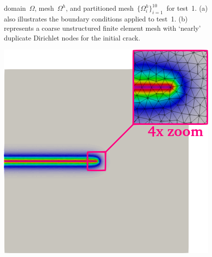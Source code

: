 \documentclass{report}
\begin{document}
\begin{figure}[tb]
\begin{minipage}[t]{.3\textwidth}
	\end{minipage}
	\caption{domain~$\Omega$, mesh~$\Omega^h$, and partitioned mesh~$\{\Omega^h_i\}_{i=1}^{10}$~for test~1. (a) also illustrates the boundary conditions applied to test~1. (b) represents a coarse unstructured finite element mesh with `nearly' duplicate Dirichlet nodes for the initial crack.\label{fig:figcrack-fe-geo-crop}}
\end{figure}	

\begin{figure}[tb]
	\centering
	\begin{minipage}[t]{.3\textwidth}
		\centering \includegraphics[width=.92\textwidth]{./Images/d-level1.png}
	\end{minipage}
	\begin{minipage}[t]{.3\textwidth}

\end{minipage}
\end{figure}
\end{document}
